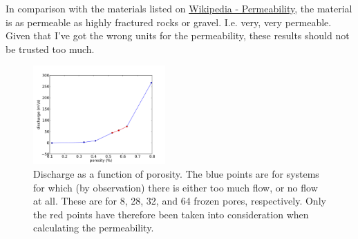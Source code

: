 \documentclass[reprint,floatfix,amsmath,amssymb,aps,pra]{revtex4-1}
\begin{document}
In comparison with the materials listed on \href{http://en.wikipedia.org/wiki/Permeability_\%28earth_sciences\%29}{Wikipedia - Permeability}, the material is as permeable as highly fractured rocks or gravel. I.e. very, very permeable. Given that I've got the wrong units for the permeability, these results should not be trusted too much.
%
\begin{figure}
  \centering
  \includegraphics[width=0.45\textwidth]{../analysis/1k-permeability/runs/2013-04-05_201140/discharge.pdf}
  \caption{Discharge as a function of porosity. The blue points are for systems for which (by observation) there is either too much flow, or no flow at all. These are for 8, 28, 32, and 64 frozen pores, respectively. Only the red points have therefore been taken into consideration when calculating the permeability.}
  \label{fig:discharges}
\end{figure}
%
\appendix





\end{document}
